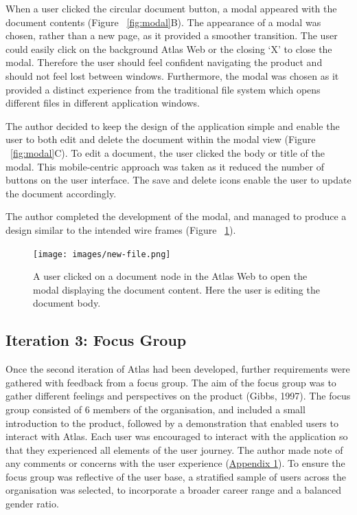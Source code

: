 \documentclass{article}
\begin{document}
When a user clicked the circular document button, a modal appeared with the document contents (Figure ~\ref{fig:modal}B). The appearance of a modal was chosen, rather than a new page, as it provided a smoother transition. The user could easily click on the background Atlas Web or the closing ‘X’ to close the modal. Therefore the user should feel confident navigating the product and should not feel lost between windows. Furthermore, the modal was chosen as it provided a distinct experience from the traditional file system which opens different files in different application windows.

The author decided to keep the design of the application simple and enable the user to both edit and delete the document within the modal view (Figure ~\ref{fig:modal}C). To edit a document, the user clicked the body or title of the modal. This mobile-centric approach was taken as it reduced the number of buttons on the user interface. The save and delete icons enable the user to update the document accordingly.

The author completed the development of the modal, and managed to produce a design similar to the intended wire frames (Figure ~\ref{fig:new-file}).

\begin{figure}[!htb]
  \centering
      \texttt{[image: images/new-file.png]}
  \caption{A user clicked on a document node in the Atlas Web to open the modal displaying the document content. Here the user is editing the document body.}
  \label{fig:new-file}
\end{figure}

\subsection{Iteration 3: Focus Group}

Once the second iteration of Atlas had been developed, further requirements were gathered with feedback from a focus group. The aim of the focus group was to gather different feelings and perspectives on the product (Gibbs, 1997). The focus group consisted of 6 members of the organisation, and included a small introduction to the product, followed by a demonstration that enabled users to interact with Atlas. Each user was encouraged to interact with the application so that they experienced all elements of the user journey. The author made note of any comments or concerns with the user experience (\hyperref[sec:appendix-1]{Appendix 1}). To ensure the focus group was reflective of the user base, a stratified sample of users across the organisation was selected, to incorporate a broader career range and a balanced gender ratio. 
\end{document}
